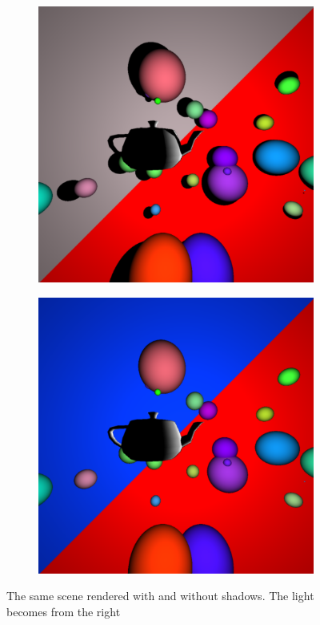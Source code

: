 \documentclass[acmsmall]{acmart}
\begin{document}
\begin{figure}[h]
    \centering
    
\begin{subfigure}{.5\textwidth}
  \centering
  \includegraphics[width=.9\linewidth]{img/withshadow.png}
\end{subfigure}%
\begin{subfigure}{.5\textwidth}
  \centering
  \includegraphics[width=.9\linewidth]{img/withoutshadow.png}
\end{subfigure}    
    
    \caption{The same scene rendered with and without shadows. The light becomes from the right}
    \label{fig:shadow}
\end{figure}
\end{document}
